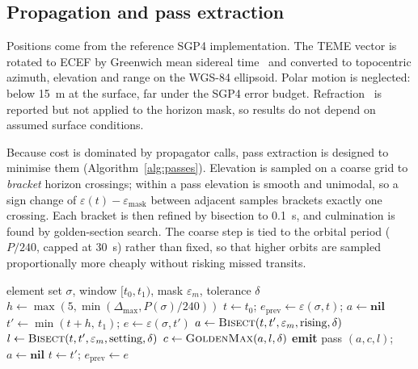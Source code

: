 \documentclass[conference]{IEEEtran}
\begin{document}
\subsection{Propagation and pass extraction}
Positions come from the reference SGP4 implementation. The TEME vector is rotated
to ECEF by Greenwich mean sidereal time~\cite{seidelmann1982iau} and converted to
topocentric azimuth, elevation and range on the WGS-84 ellipsoid. Polar motion is
neglected: below \SI{15}{\metre} at the surface, far under the SGP4 error budget.
Refraction~\cite{bennett1982refraction} is reported but not applied to the
horizon mask, so results do not depend on assumed surface conditions.

Because cost is dominated by propagator calls, pass extraction is designed to
minimise them (Algorithm~\ref{alg:passes}). Elevation is sampled on a coarse grid
to \emph{bracket} horizon crossings; within a pass elevation is smooth and
unimodal, so a sign change of $\varepsilon(t) - \varepsilon_\mathrm{mask}$
between adjacent samples brackets exactly one crossing. Each bracket is then
refined by bisection to \SI{0.1}{\second}, and culmination is found by
golden-section search. The coarse step is tied to the orbital period
($P/240$, capped at \SI{30}{\second}) rather than fixed, so that higher orbits
are sampled proportionally more cheaply without risking missed transits.

\begin{algorithm}[t]
\caption{Pass extraction for one object}
\label{alg:passes}
\begin{algorithmic}[1]
\Require element set $\sigma$, window $[t_0,t_1)$, mask $\varepsilon_m$,
         tolerance $\delta$
\State $h \gets \max(5,\min(\Delta_\mathrm{max}, P(\sigma)/240))$
\State $t \gets t_0$; \; $e_\mathrm{prev} \gets \varepsilon(\sigma,t)$;
       \; $a \gets \textbf{nil}$
  \State $t' \gets \min(t+h,\,t_1)$; \; $e \gets \varepsilon(\sigma,t')$
     \State $a \gets \textsc{Bisect}(t,t',\varepsilon_m,\text{rising},\delta)$
     \State $l \gets \textsc{Bisect}(t,t',\varepsilon_m,\text{setting},\delta)$
     \State $c \gets \textsc{GoldenMax}(a,l,\delta)$
     \State \textbf{emit} pass $(a,c,l)$; \; $a \gets \textbf{nil}$
  \EndIf
  \State $t \gets t'$; \; $e_\mathrm{prev} \gets e$
\EndWhile
\end{algorithmic}
\end{algorithm}
\end{document}
